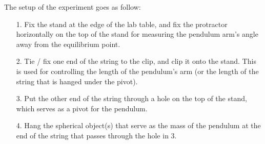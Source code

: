 \documentclass{article}
\begin{document}
The setup of the experiment goes as follow:
\begin{itemize}
    \item[1.] Fix the stand at the edge of the lab table, and fix the protractor horizontally on the top of the stand for measuring the pendulum arm's angle away from the equilibrium point.
    \item[2.] Tie / fix one end of the string to the clip, and clip it onto the stand. This is used for controlling the length of the pendulum's arm (or the length of the string that is hanged under the pivot).
    \item[3.] Put the other end of the string through a hole on the top of the stand, which serves as a pivot for the pendulum.
    \item[4.] Hang the spherical object(s) that serve as the mass of the pendulum at the end of the string that passes through the hole in 3.
\end{itemize}
\end{document}
